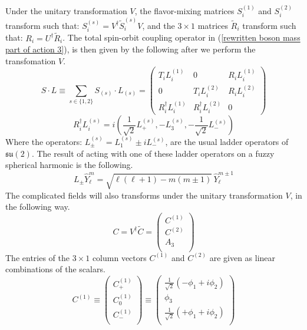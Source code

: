 \newpage
Under the unitary transformation $V$, the flavor-mixing matrices $S^{(1)}_i$ and $S^{(2)}_i$ transform such that: $S^{(s)}_i = V^\dagger \tilde{S}^{(s)}_i V$, and the $3 \times 1$ matrices $\tilde{R}_i$ transform such that: $R_i = U^\dagger \tilde{R}_i$. The total spin-orbit coupling operator in (\ref{rewritten boson mass part of action 3}), is then given by the following after we perform the transfomation $V$.
%
%
\begin{equation}\label{spin-orbit coupling}
S \cdot L \equiv \sum_{s \in \{ 1,2 \} } S_{(s)} \cdot L_{(s)}
=
\left( \begin{array}{ccc}
T_i L_i^{(1)} & 0 & R_i L_i^{(1)} \\
0 & T_i L_i^{(2)} & R_i L_i^{(2)} \\
R_i^\dagger L_i^{(1)} & R_i^\dagger L_i^{(2)} & 0
\end{array} \right)
\end{equation}
%
%
\begin{equation}
R_i^\dagger L_i^{(s)} = i \left(
\frac{1}{\sqrt{2}} L_{+}^{(s)}
,
-L_3^{(s)}
,
-\frac{1}{\sqrt{2}} L_{-}^{(s)}
\right)
\end{equation}
%
%
Where the operators: $L^{(s)}_{\pm} = L^{(s)}_{1} \pm i L^{(s)}_{-}$, are the usual ladder operators of $\mathfrak{su}(2)$. The result of acting with one of these ladder operators on a fuzzy spherical harmonic is the following.
%
%
\begin{equation}\label{ladder operators}
L_{\pm} \hat{Y}^m_\ell = \sqrt{\ell (\ell + 1) - m (m \pm 1)} \,
\hat{Y}^{m \pm 1}_\ell
\end{equation}
%
%
The complicated fields will also transforms under the unitary transformation $V$, in the following way.
%
%
\begin{equation}\label{complicated fields after V}
C = V^\dagger \tilde{C}
=
\left( \begin{array}{c}
C^{(1)} \\
C^{(2)} \\
A_3 \\
\end{array} \right)
\end{equation}
%
%
The entries of the $3 \times 1$ column vectors $C^{(1)}$ and $C^{(2)}$ are given as linear combinations of the scalars.
%
%
\begin{equation}\label{T eiegen-fields 1}
C^{(1)}
\equiv
\left( \begin{array}{c}
C^{(1)}_{+} \\
C^{(1)}_{0} \\
C^{(1)}_{-} \\
\end{array} \right)
\equiv
\left( \begin{array}{c}
\frac{1}{\sqrt{2}} (-\phi_1 + i \phi_2) \\
\phi_3 \\
\frac{1}{\sqrt{2}} (+\phi_1 + i \phi_2) \\
\end{array} \right)
\end{equation}
